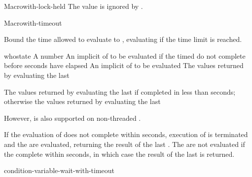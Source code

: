 \begin{functiondoc}{Macro}{with-lock-held}{\code{(} 
    \code{)}
    \superstar{} 
    \returns{} \superstar}
\fnnote The  value is ignored by
.

\end{functiondoc}


\begin{functiondoc}{Macro}{with-timeout}{\code{(} 
    \superstar{}\code{)}
    \superstar{} 
    \returns{} \superstar}
\fnsyntax

\fnpurpose Bound the time allowed to evaluate  to
, evaluating  if the time
limit is reached.

\fnpackage {}

\fnmodule {}

\fnargs
\begin{args}{whostate}
\arg[seconds] A number
 An implicit  of  to be
evaluated if the timed  do not complete before  seconds have elapsed
\arg[forms] An implicit  of  to be evaluated
\arg[results] The values returned by evaluating the last 
\end{args}

\fnreturns The values returned by evaluating the last  if
completed in less than  seconds; otherwise the values
returned by evaluating the last 

\fnerrors \nothreads{} However,  is also
supported on non-threaded .

\fndescription If the evaluation of  does not complete
within  seconds, execution of  is
terminated and the  are evaluated, returning the
result of the last . The 
are not evaluated if the  complete within
 seconds, in which case the result of the last
 is returned.

\begin{alsos}{condition-variable-wait-with-timeout}
\end{alsos}


\end{functiondoc}

